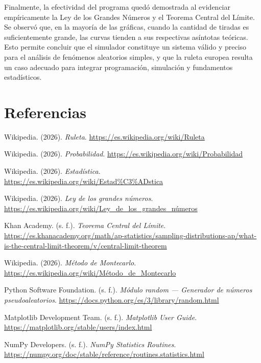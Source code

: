 \documentclass{article}
\begin{document}
Finalmente, la efectividad del programa quedó demostrada al evidenciar empíricamente la Ley de los Grandes Números y el Teorema Central del Límite. Se observó que, en la mayoría de las gráficas, cuando la cantidad de tiradas es suficientemente grande, las curvas tienden a sus respectivas asíntotas teóricas. Esto permite concluir que el simulador constituye un sistema válido y preciso para el análisis de fenómenos aleatorios simples, y que la ruleta europea resulta un caso adecuado para integrar programación, simulación y fundamentos estadísticos.

\newpage

\section{Referencias}

\begin{enumerate}[label={[\arabic*]}, leftmargin=*]

    \item Wikipedia. (2026). \textit{Ruleta}. 
    \url{https://es.wikipedia.org/wiki/Ruleta}

    \item Wikipedia. (2026). \textit{Probabilidad}. 
    \url{https://es.wikipedia.org/wiki/Probabilidad}

    \item Wikipedia. (2026). \textit{Estadística}. 
    \url{https://es.wikipedia.org/wiki/Estad%C3%ADstica}

    \item Wikipedia. (2026). \textit{Ley de los grandes números}. 
    \url{https://es.wikipedia.org/wiki/Ley_de_los_grandes_números}

    \item Khan Academy. (s. f.). \textit{Teorema Central del Límite}. 
    \url{https://es.khanacademy.org/math/ap-statistics/sampling-distributions-ap/what-is-the-central-limit-theorem/v/central-limit-theorem}

    \item Wikipedia. (2026). \textit{Método de Montecarlo}. 
    \url{https://es.wikipedia.org/wiki/Método_de_Montecarlo}

    \item Python Software Foundation. (s. f.). \textit{Módulo random — Generador de números pseudoaleatorios}. 
    \url{https://docs.python.org/es/3/library/random.html}

    \item Matplotlib Development Team. (s. f.). \textit{Matplotlib User Guide}. 
    \url{https://matplotlib.org/stable/users/index.html}

    \item NumPy Developers. (s. f.). \textit{NumPy Statistics Routines}. 
    \url{https://numpy.org/doc/stable/reference/routines.statistics.html}

\end{enumerate}
\end{document}
